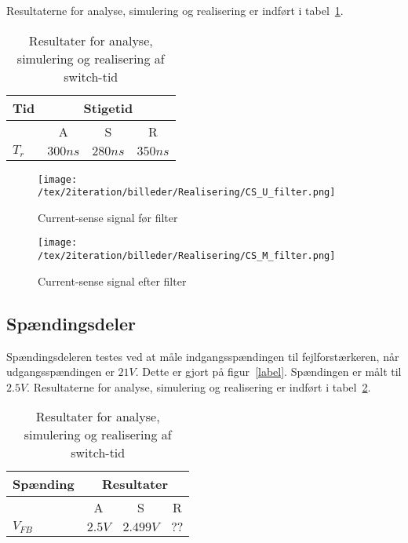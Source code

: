 \noindent Resultaterne for analyse, simulering og realisering er indført i tabel~\ref{tab:resultater_cs_filter_2}.


\begin{table}[H] 			
	\centering
	\begin{tabularx}{\textwidth}{|X|c|c|c|}
		\hline
		\textbf{Tid} & \multicolumn{3}{|c|}{\textbf{Stigetid}} 										\\ \hline
		& A & S & R 									\\ \hline
		$T_{r}$ & $300ns$ & $280ns$ & $350ns$ 									\\ \hline 
		
	\end{tabularx}
	\caption{Resultater for analyse, simulering og realisering af switch-tid}
	\label{tab:resultater_cs_filter_2}
\end{table}

\begin{figure}[H]
	\center
	\texttt{[image: /tex/2iteration/billeder/Realisering/CS\_U\_filter.png]}
	\caption{Current-sense signal før filter}
	\label{fig:CS_U_filter}
\end{figure}

\begin{figure}[H]
	\center
	\texttt{[image: /tex/2iteration/billeder/Realisering/CS\_M\_filter.png]}
	\caption{Current-sense signal efter filter}
	\label{fig:CS_M_filter}
\end{figure}


\subsection{Spændingsdeler}
\noindent Spændingsdeleren testes ved at måle indgangsspændingen til fejlforstærkeren, når udgangsspændingen er $21V$. Dette er gjort på figur~\ref{label}. Spændingen er målt til $2.5V$. Resultaterne for analyse, simulering og realisering er indført i tabel~\ref{tab:resultat_voltage_divider}.


\begin{table}[H] 			
	\centering
	\begin{tabularx}{\textwidth}{|X|c|c|c|}
		\hline
		\textbf{Spænding} & \multicolumn{3}{|c|}{\textbf{Resultater}} 		\\ \hline
		& A & S & R 									\\ \hline
		$V_{FB}$ & $2.5V$ & $2.499V$ & $??$ 									\\ \hline 
		
	\end{tabularx}
	\caption{Resultater for analyse, simulering og realisering af switch-tid}
	\label{tab:resultat_voltage_divider}
\end{table}


